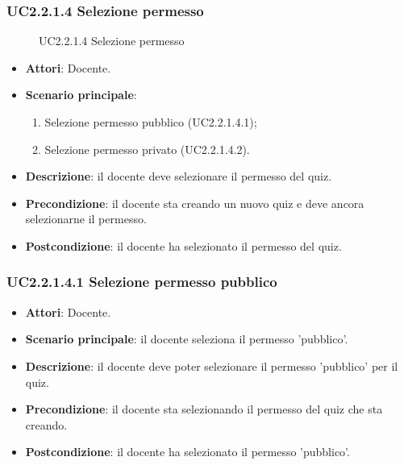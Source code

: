 \subsubsection{UC2.2.1.4 Selezione permesso}
\begin{figure}[H]
\centering
\noindent{}
\caption{UC2.2.1.4 Selezione permesso}
\end{figure}
\begin{itemize}
\item \textbf{Attori}: Docente.
\item \textbf{Scenario principale}:
\begin{enumerate}
\item Selezione permesso pubblico (UC2.2.1.4.1);
\item Selezione permesso privato (UC2.2.1.4.2).
\end{enumerate}
\item \textbf{Descrizione}: il docente deve selezionare il permesso del quiz.
\item \textbf{Precondizione}: il docente sta creando un nuovo quiz e deve ancora selezionarne il permesso.
\item \textbf{Postcondizione}: il docente ha selezionato il permesso del quiz.
\end{itemize}
\subsubsection{UC2.2.1.4.1 Selezione permesso pubblico}
\begin{itemize}
\item \textbf{Attori}: Docente.
\item \textbf{Scenario principale}: il docente seleziona il permesso 'pubblico'.
\item \textbf{Descrizione}: il docente deve poter selezionare il permesso 'pubblico' per il quiz.
\item \textbf{Precondizione}: il docente sta selezionando il permesso del quiz che sta creando.
\item \textbf{Postcondizione}: il docente ha selezionato il permesso 'pubblico'.
\end{itemize}
